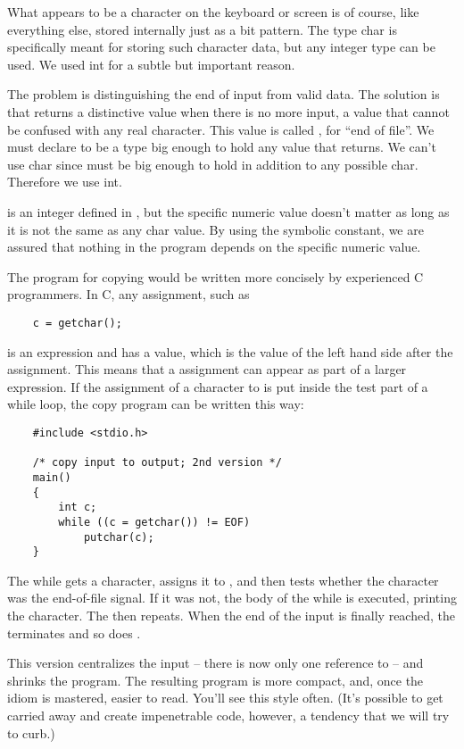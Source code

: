 What appears to be a character on the keyboard or screen is of course, like everything else, stored internally just as a bit pattern.
The type char is specifically meant for storing such character data, but any integer type can be used.
We used int for a subtle but important reason.

The problem is distinguishing the end of input from valid data.
The solution is that  returns a distinctive value when there is no more input, a value that cannot be confused with any real character.
This value is called , for ``end of file''.
We must declare  to be a type big enough to hold any value that  returns.
We can't use char since  must be big enough to hold  in addition to any possible char.
Therefore we use int.

 is an integer defined in , but the specific numeric value doesn't matter as long as it is not the same as any char value.
By using the symbolic constant, we are assured that nothing in the program depends on the specific numeric value.

The program for copying would be written more concisely by experienced C programmers.
In C, any assignment, such as
\begin{lstlisting}
	c = getchar();
\end{lstlisting}
is an expression and has a value, which is the value of the left hand side after the assignment.
This means that a assignment can appear as part of a larger expression.
If the assignment of a character to  is put inside the test part of a while loop, the copy program can be written this way:
\begin{lstlisting}
	#include <stdio.h>

	/* copy input to output; 2nd version */
	main()
	{
		int c;
		while ((c = getchar()) != EOF)
			putchar(c);
	}
\end{lstlisting}
The while gets a character, assigns it to , and then tests whether the character was the end-of-file signal.
If it was not, the body of the while is executed, printing the character.
The  then repeats.
When the end of the input is finally reached, the  terminates and so does .

This version centralizes the input -- there is now only one reference to  -- and shrinks the program.
The resulting program is more compact, and, once the idiom is mastered, easier to read. You'll see this style often.
(It's possible to get carried away and create impenetrable code, however, a tendency that we will try to curb.)

